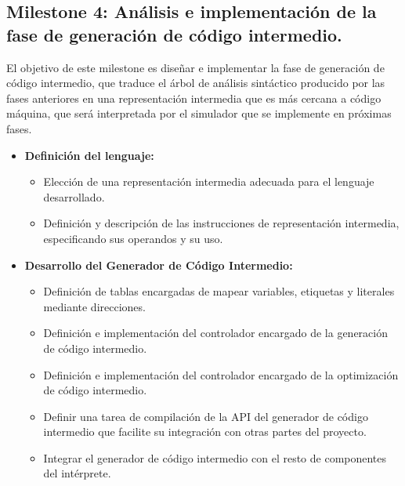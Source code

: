 \subsection{Milestone 4: Análisis e implementación de la fase de generación de código intermedio.}
El objetivo de este milestone es diseñar e implementar la fase de generación de código intermedio, que traduce el árbol de análisis sintáctico producido por las fases anteriores en una representación intermedia que es más cercana a código máquina,  que será interpretada por el simulador que se implemente en próximas fases.

\begin{itemize}
    \item \textbf{Definición del lenguaje:}
    \begin{itemize}
        \item Elección de una representación intermedia adecuada para el lenguaje desarrollado.
        \item Definición y descripción de las instrucciones de representación intermedia, especificando sus operandos y su uso.
    \end{itemize}
    
    \item \textbf{Desarrollo del Generador de Código Intermedio:}
    \begin{itemize}
        \item Definición de tablas encargadas de mapear variables, etiquetas y literales mediante direcciones.
        \item Definición e implementación del controlador encargado de la generación de código intermedio.
        \item Definición e implementación del controlador encargado de la optimización de código intermedio.
        \item Definir una tarea de compilación de la API del generador de código intermedio que facilite su integración con otras partes del proyecto.
        \item Integrar el generador de código intermedio con el resto de componentes del intérprete.
    \end{itemize}


\end{itemize}
